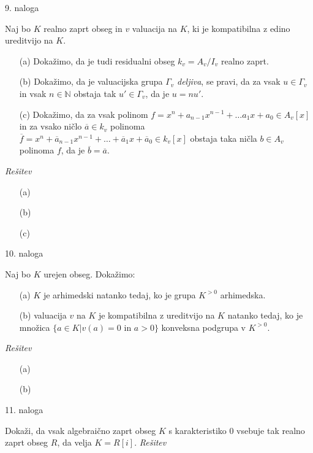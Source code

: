 \documentclass[a4paper, 12pt]{article}
\newcommand{\N}{\mathbb{N}}
\begin{document}
\begin{flushleft}
9. naloga
\end{flushleft}
Naj bo $K$ realno zaprt obseg in $v$ valuacija na $K$, ki je kompatibilna z edino ureditvijo na $K$. 
\begin{enumerate}
\item[(a)] Dokažimo, da je tudi residualni obseg $k_v = A_v / I_v$ realno zaprt.
\item[(b)] Dokažimo, da je valuacijska grupa $\Gamma_v$ \emph{deljiva}, se pravi, da za vsak $u \in \Gamma_v$ in vsak $n\in \N$ obstaja tak $u' \in \Gamma_v$, da je $u = nu'$.
\item[(c)] Dokažimo, da za vsak polinom $f=x^n + a_{n-1} x^{n-1} + \dots a_1 x + a_0 \in A_v[x]$ in za vsako ničlo $\overline{a} \in k_v$ polinoma  $\overline{f} =x^n + \overline{a}_{n-1} x^{n-1} + \dots +\overline{a}_1 x + \overline{a}_0 \in k_v[x]$ obstaja taka ničla $b\in A_v$ polinoma $f$, da je $\overline{b} = \overline{a}$.
\end{enumerate}
\emph{Rešitev}
\begin{enumerate}
\item[(a)]
\item[(b)]
\item[(c)]
\end{enumerate}

\begin{flushleft}
10. naloga
\end{flushleft}
Naj bo $K$ urejen obseg. Dokažimo:
\begin{enumerate}
\item[(a)] $K$ je arhimedski natanko tedaj, ko je grupa $K^{>0}$ arhimedska.
\item[(b)] valuacija $v$ na $K$ je kompatibilna z ureditvijo na $K$ natanko tedaj, ko je množica $\{a\in K| v(a) = 0 \text{ in } a > 0\}$ konveksna podgrupa v $K^{>0}$.
\end{enumerate}
\emph{Rešitev}
\begin{enumerate}
\item[(a)]
\item[(b)]
\end{enumerate}

\begin{flushleft}
11. naloga
\end{flushleft}
Dokaži, da vsak algebraično zaprt obseg $K$ s karakteristiko 0 vsebuje tak realno zaprt obseg $R$, da velja $K = R[i]$.
\newline
\emph{Rešitev}
\newline
\end{document}
